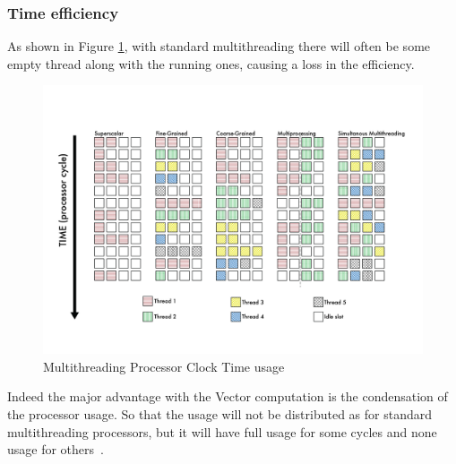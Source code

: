 \subsubsection{Time efficiency}
As shown in Figure \ref{Multithreading}, with standard multithreading there will often be some empty thread along with the running ones, causing a loss in the efficiency.
\begin{figure}[H]
    \centering
    \includegraphics[scale = 0.5]{Chapter_1/img/threads.png}
    \caption{Multithreading Processor Clock Time usage  \cite{L15-Krste}}
    \label{Multithreading}
\end{figure}

Indeed the major advantage with the Vector computation is the condensation of the processor usage. 
So that the usage will not be distributed as for standard multithreading processors, but it will have full usage for some cycles and none usage for others~\cite{L15-Krste}.

